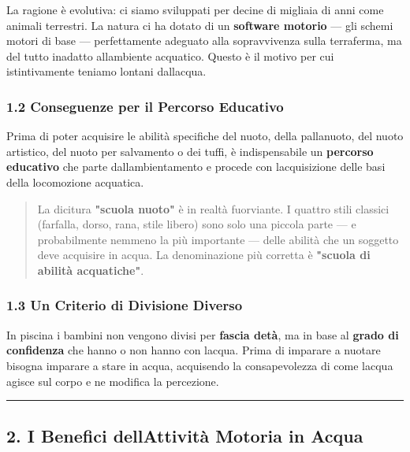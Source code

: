 \documentclass[a4paper,11pt]{article}
\begin{document}
La ragione è evolutiva: ci siamo sviluppati per decine di migliaia di
anni come animali terrestri. La natura ci ha dotato di un
\textbf{software motorio} --- gli schemi motori di base ---
perfettamente adeguato alla sopravvivenza sulla terraferma, ma del tutto
inadatto all\textquotesingle ambiente acquatico. Questo è il motivo per
cui istintivamente teniamo lontani dall\textquotesingle acqua.

\subsubsection{1.2 Conseguenze per il Percorso
      Educativo}\label{conseguenze-per-il-percorso-educativo}

Prima di poter acquisire le abilità specifiche del nuoto, della
pallanuoto, del nuoto artistico, del nuoto per salvamento o dei tuffi, è
indispensabile un \textbf{percorso educativo} che parte
dall\textquotesingle ambientamento e procede con
l\textquotesingle acquisizione delle basi della locomozione acquatica.

\begin{quote}
      La dicitura \textbf{"scuola nuoto"} è in realtà fuorviante. I quattro
      stili classici (farfalla, dorso, rana, stile libero) sono solo una
      piccola parte --- e probabilmente nemmeno la più importante --- delle
      abilità che un soggetto deve acquisire in acqua. La denominazione più
      corretta è \textbf{"scuola di abilità acquatiche"}.
\end{quote}

\subsubsection{1.3 Un Criterio di Divisione
      Diverso}\label{un-criterio-di-divisione-diverso}

In piscina i bambini non vengono divisi per \textbf{fascia
      d\textquotesingle età}, ma in base al \textbf{grado di confidenza} che
hanno o non hanno con l\textquotesingle acqua. Prima di imparare a
nuotare bisogna imparare a stare in acqua, acquisendo la consapevolezza
di come l\textquotesingle acqua agisce sul corpo e ne modifica la
percezione.

\begin{center}\rule{0.5\linewidth}{0.5pt}\end{center}

\subsection{2. I Benefici dell\textquotesingle Attività Motoria in
      Acqua}\label{i-benefici-dellattivituxe0-motoria-in-acqua}
\end{document}
